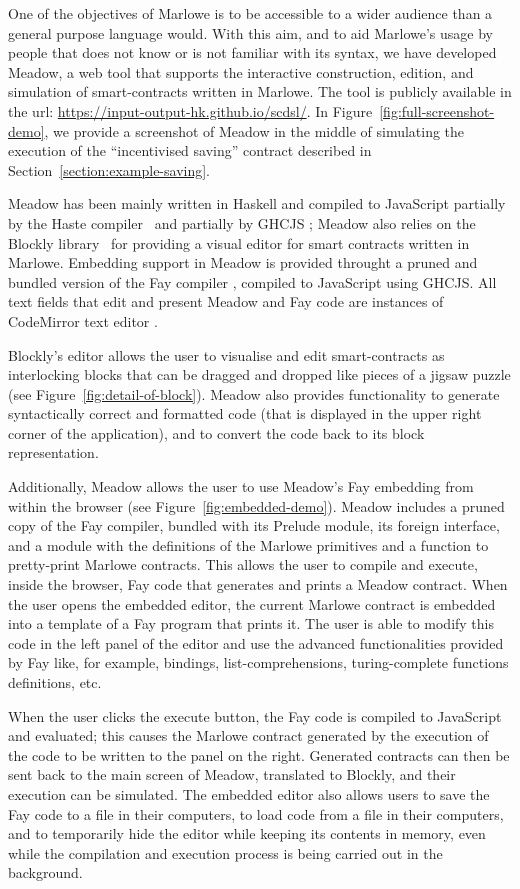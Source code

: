 \documentclass[runningheads]{llncs}
\begin{document}
One of the objectives of Marlowe is to be accessible to a wider audience
than a general purpose language would. With this aim, and to aid Marlowe's
usage by people that does not know or is not familiar with its syntax,
we have developed Meadow, a web tool that supports the interactive construction,
edition, and simulation of smart-contracts written in Marlowe. The
tool is publicly available in the url: \url{https://input-output-hk.github.io/scdsl/}.
In Figure~\ref{fig:full-screenshot-demo}, we provide a screenshot
of Meadow in the middle of simulating the execution of the ``incentivised
saving'' contract described in Section~\ref{section:example-saving}.

Meadow has been mainly written in Haskell and compiled to JavaScript
partially by the Haste compiler~\cite{Haste} and partially by GHCJS \cite{GHCJS};
Meadow also relies on the Blockly library~\cite{Blockly} for providing a visual
editor for smart contracts written in Marlowe. Embedding support in Meadow
is provided throught a pruned and bundled version of the Fay compiler \cite{Fay},
compiled to JavaScript using GHCJS. All text fields that edit and present Meadow and Fay code are
instances of CodeMirror text editor \cite{CodeMirror}.

Blockly's editor allows the user to visualise and edit
smart-contracts as interlocking blocks that can be dragged and dropped
like pieces of a jigsaw puzzle (see Figure~\ref{fig:detail-of-block}).
Meadow also provides functionality to generate syntactically correct
and formatted code (that is displayed in the upper right corner of the application),
and to convert the code back to its block representation.

Additionally, Meadow allows the user to use Meadow's Fay embedding from within the browser (see 
Figure~\ref{fig:embedded-demo}). Meadow includes a pruned copy of the Fay compiler, bundled with its Prelude module, 
its foreign interface, and a module with the definitions of the Marlowe primitives and a function to pretty-print 
Marlowe contracts. This allows the user to compile and execute, inside the browser, Fay
code that generates and prints a Meadow contract. When the user opens the embedded editor, the current Marlowe contract 
is embedded into a template of a Fay program that prints it. The user is able to modify this code in the left 
panel of the editor and use the advanced functionalities provided by Fay like, for example, bindings, 
list-comprehensions, turing-complete functions definitions, etc.

When the user clicks the execute button, the Fay code is 
compiled to JavaScript and evaluated; this causes the Marlowe contract generated by the execution of the code to be 
written to the panel on the right. Generated contracts can then be sent back to the main screen of Meadow, translated 
to Blockly, and their execution can be simulated. The embedded editor also allows users to save the Fay code to a 
file in their computers, to load code from a file in their computers, and to temporarily hide the editor while keeping 
its contents in memory, even while the compilation and execution process is being carried out in the background.
\end{document}
